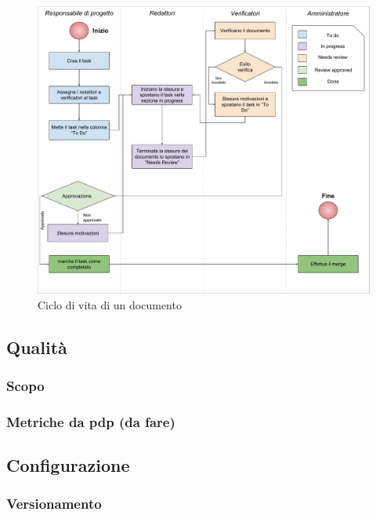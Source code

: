 \begin{figure}[H]
\centering
\includegraphics[width=17cm,trim=2 2 2 2, clip]{img/cicloVitaDocumentoAsana.pdf}
\caption{Ciclo di vita di un documento}
\label{fig:document_lifecycle}
\end{figure}

\subsection{Qualità}
\subsubsection{Scopo}
\subsubsection{Metriche da pdp (da fare)}

\subsection{Configurazione}
\subsubsection{Versionamento}

